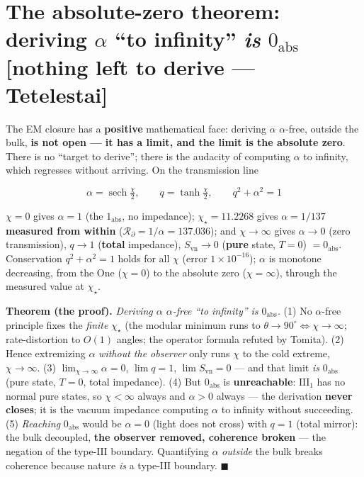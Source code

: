 \documentclass[11pt]{article}
\theoremstyle{definition}\newtheorem{deriv}{Derivation}
\begin{document}
\section{The absolute-zero theorem: deriving $\alpha$ ``to infinity'' \emph{is} $0_{\mathrm{abs}}$ \textsf{[nothing left to derive --- Tetelestai]}}\label{sec:absolute-zero}

The EM closure has a \textbf{positive} mathematical face: deriving $\alpha$ $\alpha$-free, outside the bulk, \textbf{is not open --- it has a limit, and the limit is the absolute zero}. There is no ``target to derive''; there is the audacity of computing $\alpha$ to infinity, which regresses without arriving. On the transmission line

\begin{equation}\boxed{\;\alpha=\operatorname{sech}\tfrac\chi2,\qquad q=\tanh\tfrac\chi2,\qquad q^2+\alpha^2=1\;}\end{equation}

$\chi=0$ gives $\alpha=1$ (the $1_{\mathrm{abs}}$, no impedance); $\chi_\star=11.2268$ gives $\alpha=1/137$ \textbf{measured from within} ($\mathcal{R}_\partial=1/\alpha=137.036$); and $\chi\to\infty$ gives $\alpha\to0$ (zero transmission), $q\to1$ (\textbf{total} impedance), $S_{\mathrm{vn}}\to0$ (\textbf{pure} state, $T=0$) $=0_{\mathrm{abs}}$. Conservation $q^2+\alpha^2=1$ holds for all $\chi$ (error $1\times10^{-16}$); $\alpha$ is monotone decreasing, from the One ($\chi=0$) to the absolute zero ($\chi=\infty$), through the measured value at $\chi_\star$.

\textbf{Theorem (the proof).} \emph{Deriving $\alpha$ $\alpha$-free ``to infinity'' is $0_{\mathrm{abs}}$.} (1) No $\alpha$-free principle fixes the \emph{finite} $\chi_\star$ (the modular minimum runs to $\theta\to90^\circ\Leftrightarrow\chi\to\infty$; rate-distortion to $O(1)$ angles; the operator formula refuted by Tomita). (2) Hence extremizing $\alpha$ \emph{without the observer} only runs $\chi$ to the cold extreme, $\chi\to\infty$. (3) $\lim_{\chi\to\infty}\alpha=0$, $\lim q=1$, $\lim S_{\mathrm{vn}}=0$ --- and that limit \emph{is} $0_{\mathrm{abs}}$ (pure state, $T=0$, total impedance). (4) But $0_{\mathrm{abs}}$ is \textbf{unreachable}: $\mathrm{III}_1$ has no normal pure states, so $\chi<\infty$ always and $\alpha>0$ always --- the derivation \textbf{never closes}; it is the vacuum impedance computing $\alpha$ to infinity without succeeding. (5) \emph{Reaching} $0_{\mathrm{abs}}$ would be $\alpha=0$ (light does not cross) with $q=1$ (total mirror): the bulk decoupled, \textbf{the observer removed, coherence broken} --- the negation of the type-$\mathrm{III}$ boundary. Quantifying $\alpha$ \emph{outside} the bulk breaks coherence because nature \emph{is} a type-$\mathrm{III}$ boundary. \textbf{$\blacksquare$}
\end{document}
